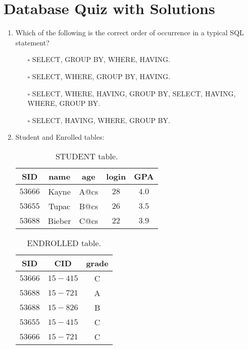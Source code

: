 \documentclass[10pt]{article}
\newcommand{\lightrule}{%
	\arrayrulecolor{black!30}%
	\midrule[\lightrulewidth]%
	\arrayrulecolor{black}}
\begin{document}
	\section{Database Quiz with Solutions}
		\begin{enumerate}
			\item Which of the following is the correct order of occurrence in a typical SQL statement?
				\begin{enumerate}
					\item[$\square$] SELECT, GROUP BY, WHERE, HAVING.
					\item[$\square$] SELECT, WHERE, GROUP BY, HAVING.
					\item[$\square$] SELECT, WHERE, HAVING, GROUP BY, SELECT, HAVING, WHERE, GROUP BY.
					\item[$\square$] SELECT, HAVING, WHERE, GROUP BY.
				\end{enumerate}

			\item Student and Enrolled tables:
				\begin{table}[H]
					\centering
					\begin{tabular}{@{} *{5}{c} @{}}
						\toprule
							\textbf{SID} & \textbf{name} & \textbf{age} & \textbf{login} & \textbf{GPA} \\
						\midrule
							$53666$ & Kayne & A@cs & $28$ & $4.0$ \\ 
						\lightrule
							$53655$ & Tupac & B@cs & $26$ & $3.5$ \\  
						\lightrule
							$53688$ & Bieber & C@cs & $22$ & $3.9$ \\ 
						\bottomrule
					\end{tabular}
					\caption{STUDENT table.}
				\end{table}

				\begin{table}[H]
					\centering
					\begin{tabular}{@{} *{3}{c} @{}}
						\toprule
							\textbf{SID} & \textbf{CID} & \textbf{grade} \\
						\midrule
							$53666$ & $15-415$ & C \\ 
						\lightrule
							$53688$ & $15-721$ & A \\  
						\lightrule
							$53688$ & $15-826$ & B \\
						\lightrule 
							$53655$ & $15-415$ & C \\ 
						\lightrule 
							$53666$ & $15-721$ & C \\ 
						\bottomrule
					\end{tabular}
					\caption{ENDROLLED table.}
				\end{table}
			

\end{enumerate}
\end{document}
